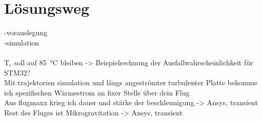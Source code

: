 \section{Lösungsweg}

-vorauslegung\\
-simulation\\
\cite{Claudio-2018, Ho-2021, Isaacs-2017, Abdel-2024, Xu-2022, Pavia-2015, Yang-2015, ST-guide, NASA-2023, Gilmore-2002, Hume-2022}\\
$\mathrm{T_c}$ soll auf \SI{85}{\celsius} bleiben -> Beispielrechnung der Ausfallwahrscheinlichkeit für STM32?\\
Mit trajektorien simulation und längs angeströmter turbulenter Platte bekomme ich spezifischen Wärmestrom an fixer Stelle über dein Flug\\
Aus flugmaxx krieg ich dauer und stärke der beschleunigung -> Ansys, transient\\
Rest des Fluges ist Mikrogravitation -> Ansys, transient\\